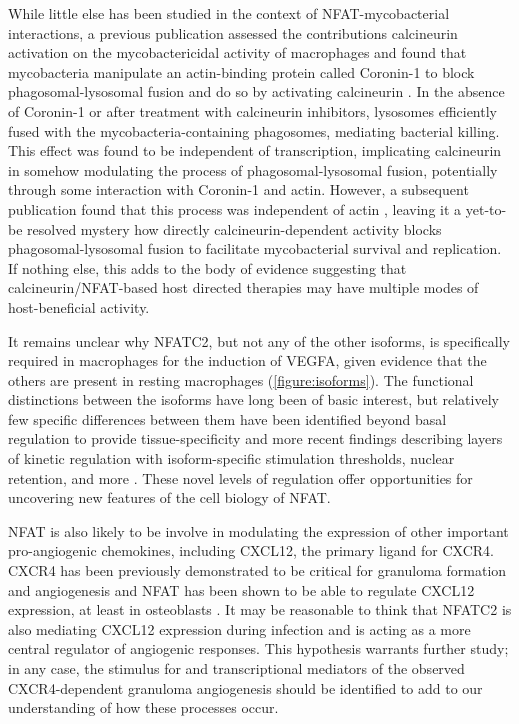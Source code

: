 While little else has been studied in the context of NFAT-mycobacterial interactions, a previous publication assessed the contributions calcineurin activation on the mycobactericidal activity of macrophages and found that mycobacteria manipulate an actin-binding protein called Coronin-1 to block phagosomal-lysosomal fusion and do so by activating calcineurin \citep{Jayachandran2007}. In the absence of Coronin-1 or after treatment with calcineurin inhibitors, lysosomes efficiently fused with the mycobacteria-containing phagosomes, mediating bacterial killing. This effect was found to be independent of transcription, implicating calcineurin in somehow modulating the process of phagosomal-lysosomal fusion, potentially through some interaction with Coronin-1 and actin. However, a subsequent publication found that this process was independent of actin \citep{Jayachandran2008}, leaving it a yet-to-be resolved mystery how directly calcineurin-dependent activity blocks phagosomal-lysosomal fusion to facilitate mycobacterial survival and replication. If nothing else, this adds to the body of evidence suggesting that calcineurin/NFAT-based host directed therapies may have multiple modes of host-beneficial activity.

It remains unclear why NFATC2, but not any of the other isoforms, is specifically required in macrophages for the induction of VEGFA, given evidence that the others are present in resting macrophages (\autoref{figure:isoforms}). The functional distinctions between the isoforms have long been of basic interest, but relatively few specific differences between them have been identified beyond basal regulation to provide tissue-specificity and more recent findings describing layers of kinetic regulation with isoform-specific stimulation thresholds, nuclear retention, and more \citep{Lyakh1997, Rao1997, Kar2014, Kar2015, Kar2016, Yissachar2013}. These novel levels of regulation offer opportunities for uncovering new features of the cell biology of NFAT.

NFAT is also likely to be involve in modulating the expression of other important pro-angiogenic chemokines, including CXCL12, the primary ligand for CXCR4. CXCR4 has been previously demonstrated to be critical for granuloma formation and angiogenesis \citep{Torraca2017} and NFAT has been shown to be able to regulate CXCL12 expression, at least in osteoblasts \citep{Sesler2013}. It may be reasonable to think that NFATC2 is also mediating CXCL12 expression during infection and is acting as a more central regulator of angiogenic responses. This hypothesis warrants further study; in any case, the stimulus for and transcriptional mediators of the observed CXCR4-dependent granuloma angiogenesis should be identified to add to our understanding of how these processes occur.

